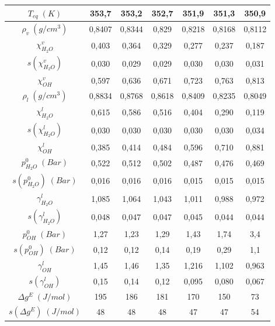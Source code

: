 \documentclass[a4paper,12pt,titlepage]{article}
\begin{document}
\begin{table}[]
\centering
\begin{tabular}{|c|c|c|c|c|c|c|}
\hline
$T_{eq}\; (K)$               & 353,7  & 353,2  & 352,7  & 351,9  & 351,3  & 350,9  \\ \hline
$\rho_v\; (g/cm^3)$          & 0,8407 & 0,8344 & 0,829  & 0,8218 & 0,8168 & 0,8112 \\ \hline
$\chi_{H_2O}^v$             & 0,403  & 0,364  & 0,329  & 0,277  & 0,237  & 0,187  \\ \hline
$s(\chi_{H_2O}^v)$          & 0,030  & 0,029  & 0,029  & 0,030  & 0,030  & 0,031  \\ \hline
$\chi_{OH}^v$               & 0,597  & 0,636  & 0,671  & 0,723  & 0,763  & 0,813  \\ \hline
$\rho_l\; (g/cm^3)$          & 0,8834 & 0,8768 & 0,8618 & 0,8409 & 0,8235 & 0,8049 \\ \hline
$\chi_{H_2O}^l$             & 0,615  & 0,586  & 0,516  & 0,404  & 0,290  & 0,119  \\ \hline
$s(\chi_{H_2O}^l)$          & 0,030  & 0,030  & 0,030  & 0,030  & 0,030  & 0,034  \\ \hline
$\chi_{OH}^l$               & 0,385  & 0,414  & 0,484  & 0,596  & 0,710  & 0,881  \\ \hline
$p_{H_2O}^0 \;(Bar)$         & 0,522  & 0,512  & 0,502  & 0,487  & 0,476  & 0,469  \\ \hline
$s(p_{H_2O}^0) \;(Bar)$      & 0,016  & 0,016  & 0,016  & 0,015  & 0,015  & 0,015  \\ \hline
$\gamma_{H_2O}^l$            & 1,085  & 1,064  & 1,043  & 1,011  & 0,988  & 0,972  \\ \hline
$s(\gamma_{H_2O}^l)$         & 0,048  & 0,047  & 0,047  & 0,045  & 0,044  & 0,044  \\ \hline
$p_{OH}^0 \;(Bar)$           & 1,27   & 1,23   & 1,29   & 1,43   & 1,74   & 3,4    \\ \hline
$s(p_{OH}^0) \;(Bar)$        & 0,12   & 0,12   & 0,14   & 0,19   & 0,29   & 1,1    \\ \hline
$\gamma_{OH}^l$              & 1,45   & 1,46   & 1,35   & 1,216  & 1,102  & 0,963  \\ \hline
$s(\gamma_{OH}^l)$           & 0,15   & 0,14   & 0,12   & 0,095  & 0,080  & 0,067  \\ \hline
$\Delta g^{E} \; (J/mol)$    & 195    & 186    & 181    & 170    & 150    & 73     \\ \hline
$s(\Delta g^{E}) \; (J/mol)$ & 48     & 48     & 48     & 47     & 47     & 54     \\ \hline

\end{tabular}
\end{table}
\end{document}
